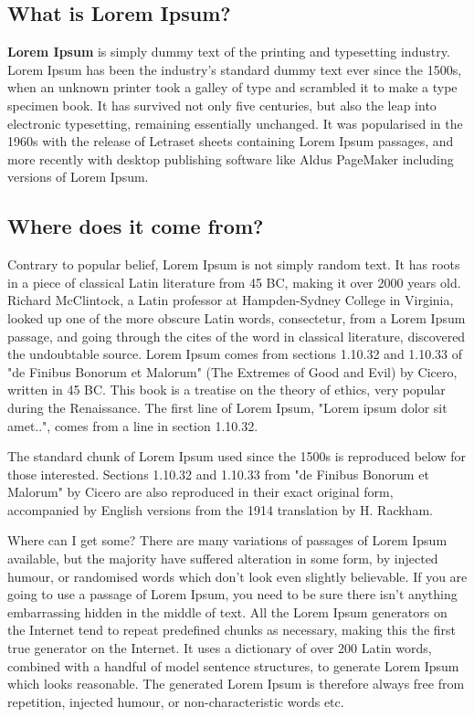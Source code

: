\documentclass[12pt]{article}
\begin{document}
\begin{Abstract}
\section{What is Lorem Ipsum?} \label{sec:firstpage}

\textbf{Lorem Ipsum} is simply dummy text of the printing and typesetting industry. Lorem Ipsum has been the industry's standard dummy text ever since the 1500s, when an unknown printer took a galley of type and scrambled it to make a type specimen book. It has survived not only five centuries, but also the leap into electronic typesetting, remaining essentially unchanged. It was popularised in the 1960s with the release of Letraset sheets containing Lorem Ipsum passages, and more recently with desktop publishing software like Aldus PageMaker including versions of Lorem Ipsum.

\subsection{Where does it come from?}
Contrary to popular belief, Lorem Ipsum is not simply random text. It has roots in a piece of classical Latin literature from 45 BC, making it over 2000 years old. Richard McClintock, a Latin professor at Hampden-Sydney College in Virginia, looked up one of the more obscure Latin words, consectetur, from a Lorem Ipsum passage, and going through the cites of the word in classical literature, discovered the undoubtable source. Lorem Ipsum comes from sections 1.10.32 and 1.10.33 of "de Finibus Bonorum et Malorum" (The Extremes of Good and Evil) by Cicero, written in 45 BC. This book is a treatise on the theory of ethics, very popular during the Renaissance. The first line of Lorem Ipsum, "Lorem ipsum dolor sit amet..", comes from a line in section 1.10.32.

The standard chunk of Lorem Ipsum used since the 1500s is reproduced below for those interested. Sections 1.10.32 and 1.10.33 from "de Finibus Bonorum et Malorum" by Cicero are also reproduced in their exact original form, accompanied by English versions from the 1914 translation by H. Rackham.

Where can I get some? There are many variations of passages of Lorem Ipsum available, but the majority have suffered alteration in some form, by injected humour, or randomised words which don't look even slightly believable. If you are going to use a passage of Lorem Ipsum, you need to be sure there isn't anything embarrassing hidden in the middle of text. All the Lorem Ipsum generators on the Internet tend to repeat predefined chunks as necessary, making this the first true generator on the Internet. It uses a dictionary of over 200 Latin words, combined with a handful of model sentence structures, to generate Lorem Ipsum which looks reasonable. The generated Lorem Ipsum is therefore always free from repetition, injected humour, or non-characteristic words etc.



\end{Abstract}
\end{document}
